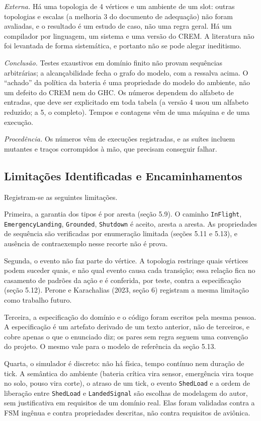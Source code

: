 \documentclass[12pt,a4paper]{article}
\begin{document}
\textit{Externa.} Há uma topologia de 4 vértices e um ambiente de um slot: outras topologias e escalas (a melhoria 3 do documento de adequação) não foram avaliadas, e o resultado é um estudo de caso, não uma regra geral. Há um compilador por linguagem, um sistema e uma versão do CREM. A literatura não foi levantada de forma sistemática, e portanto não se pode alegar ineditismo.

\textit{Conclusão.} Testes exaustivos em domínio finito não provam sequências arbitrárias; a alcançabilidade fecha o grafo do modelo, com a ressalva acima. O ``achado'' da política da bateria é uma propriedade do modelo do ambiente, não um defeito do CREM nem do GHC. Os números dependem do alfabeto de entradas, que deve ser explicitado em toda tabela (a versão 4 usou um alfabeto reduzido; a 5, o completo). Tempos e contagens vêm de uma máquina e de uma execução.

\textit{Procedência.} Os números vêm de execuções registradas, e as suítes incluem mutantes e traços corrompidos à mão, que precisam conseguir falhar.

\subsection{Limitações Identificadas e Encaminhamentos}

Registram-se as seguintes limitações.

Primeira, a garantia dos tipos é por aresta (seção 5.9). O caminho \texttt{InFlight}, \texttt{EmergencyLanding}, \texttt{Grounded}, \texttt{Shutdown} é aceito, aresta a aresta. As propriedades de sequência são verificadas por enumeração limitada (seções 5.11 e 5.13), e ausência de contraexemplo nesse recorte não é prova.

Segunda, o evento não faz parte do vértice. A topologia restringe quais vértices podem suceder quais, e não qual evento causa cada transição; essa relação fica no casamento de padrões da ação e é conferida, por teste, contra a especificação (seção 5.12). Perone e Karachalias (2023, seção 6) registram a mesma limitação como trabalho futuro.

Terceira, a especificação do domínio e o código foram escritos pela mesma pessoa. A especificação é um artefato derivado de um texto anterior, não de terceiros, e cobre apenas o que o enunciado diz; os pares sem regra seguem uma convenção do projeto. O mesmo vale para o modelo de referência da seção 5.13.

Quarta, o simulador é discreto: não há física, tempo contínuo nem duração de tick. A semântica do ambiente (bateria crítica vira sensor, emergência vira toque no solo, pouso vira corte), o atraso de um tick, o evento \texttt{ShedLoad} e a ordem de liberação entre \texttt{ShedLoad} e \texttt{LandedSignal} são escolhas de modelagem do autor, sem justificativa em requisitos de um domínio real. Elas foram validadas contra a FSM ingênua e contra propriedades descritas, não contra requisitos de aviônica.
\end{document}
